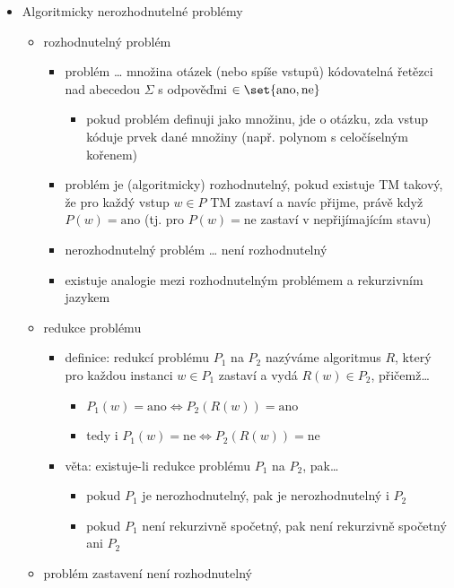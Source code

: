 \begin{itemize}
\begin{itemize}
\begin{itemize}
\end{itemize}
\end{itemize}
\item Algoritmicky nerozhodnutelné problémy
\begin{itemize}
\item rozhodnutelný problém
\begin{itemize}
\item problém \dots{} množina otázek (nebo spíše vstupů) kódovatelná řetězci nad abecedou $\Sigma$ s odpověďmi $\in\set{\text{ano},\text{ne}}$
\begin{itemize}
\item pokud problém definuji jako množinu, jde o otázku, zda vstup kóduje prvek dané množiny (např. polynom s celočíselným kořenem)
\end{itemize}
\item problém je (algoritmicky) rozhodnutelný, pokud existuje TM takový, že pro každý vstup $w\in P$ TM zastaví a navíc přijme, právě když $P(w)=\text{ano}$ (tj. pro $P(w)=\text{ne}$ zastaví v nepřijímajícím stavu)
\item nerozhodnutelný problém \dots{} není rozhodnutelný
\item existuje analogie mezi rozhodnutelným problémem a rekurzivním jazykem
\end{itemize}
\item redukce problému
\begin{itemize}
\item definice: redukcí problému $P_1$ na $P_2$ nazýváme algoritmus $R$, který pro každou instanci $w\in P_1$ zastaví a vydá $R(w)\in P_2$, přičemž\dots{}
\begin{itemize}
\item $P_1(w)=\text{ano}\iff P_2(R(w))=\text{ano}$
\item tedy i $P_1(w)=\text{ne}\iff P_2(R(w))=\text{ne}$
\end{itemize}
\item věta: existuje-li redukce problému $P_1$ na $P_2$, pak\dots{}
\begin{itemize}
\item pokud $P_1$ je nerozhodnutelný, pak je nerozhodnutelný i $P_2$
\item pokud $P_1$ není rekurzivně spočetný, pak není rekurzivně spočetný ani $P_2$
\end{itemize}
\end{itemize}
\item problém zastavení není rozhodnutelný
\begin{itemize}

\end{itemize}
\end{itemize}
\end{itemize}
